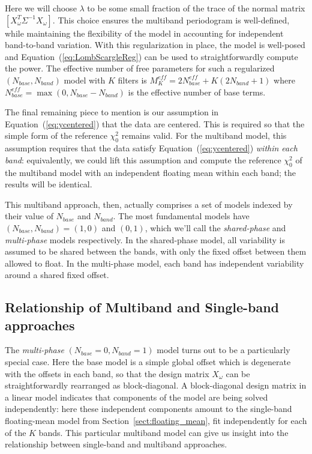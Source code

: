 \documentclass{emulateapj}
\newcommand{\Eq}[1]{Equation~(\ref{eq:#1})}
\newcommand{\eq}[1]{\Eq{#1}}
\newcommand{\Sect}[1]{Section~\ref{sect:#1}}
\newcommand{\sect}[1]{\Sect{#1}}
\newcommand{\sectlabel}[1]{\label{sect:#1}}
\begin{document}
Here we will choose $\lambda$ to be some small fraction of the trace of the normal matrix $[X_\omega^T\Sigma^{-1}X_\omega]$.
This choice ensures the multiband periodogram is well-defined, while maintaining the flexibility of the model in accounting for independent band-to-band variation. With this regularization in place, the model is well-posed and \eq{LombScargleReg} can be used to straightforwardly compute the power. The effective number of free parameters for such a regularized $(N_{base}, N_{band})$ model with $K$ filters is
$M_K^{eff} = 2N_{base}^{eff} + K(2N_{band} + 1)$ where $N_{base}^{eff} = \max(0, N_{base} - N_{band})$ is the effective number of base terms.

The final remaining piece to mention is our assumption in \eq{ycentered} that the data are centered. This is required so that the simple form of the reference $\chi^2_0$ remains valid. For the multiband model, this assumption requires that the data satisfy \eq{ycentered} {\it within each band}: equivalently, we could lift this assumption and compute the reference $\chi^2_0$ of the multiband model with an independent floating mean within each band; the results will be identical.

This multiband approach, then, actually comprises a set of models indexed by their value of $N_{base}$ and $N_{band}$. The most fundamental models have $(N_{base}, N_{band}) = (1,0)$ and $(0,1)$, which we'll call the {\it shared-phase} and {\it multi-phase} models respectively. In the shared-phase model, all variability is assumed to be shared between the bands, with only the fixed offset between them allowed to float. In the multi-phase model, each band has independent variability around a shared fixed offset.

\subsection{Relationship of Multiband and Single-band approaches}
\sectlabel{relationship}
The {\it multi-phase} $(N_{base}=0, N_{band}=1)$ model turns out to be a particularly special case.
Here the base model is a simple global offset which is degenerate with the offsets in each band, so that the design matrix $X_\omega$ can be straightforwardly rearranged as block-diagonal.
A block-diagonal design matrix in a linear model indicates that components of the model are being solved independently: here these independent components amount to the single-band floating-mean model from \sect{floating_mean}, fit independently for each of the $K$ bands.
This particular multiband model can give us insight into the relationship between single-band and multiband approaches.
\end{document}
